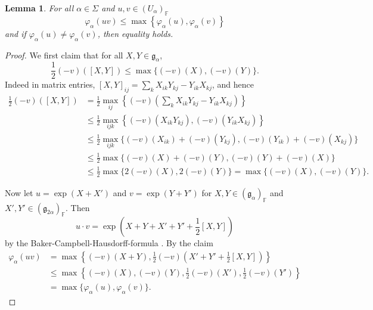 \documentclass[12pt]{amsart}
\newcommand{\F}{\mathbb{F} }
\newcommand{\frakg}{\mathfrak{g}}
\numberwithin{equation}{section}
\newtheorem{lemma}[theorem]{Lemma}
\theoremstyle{remark} %
\begin{document}
\begin{lemma}\label{lem:BTgroup_valuation}
	For all $\alpha \in \Sigma$ and $u,v \in (U_{\alpha})_\F$
	$$
	\varphi_\alpha(uv) \leq \max \left\{ \varphi_\alpha (u) , \varphi_\alpha(v) \right\}
	$$
	and if $\varphi_\alpha(u) \neq \varphi_\alpha(v)$, then equality holds.
\end{lemma}
\begin{proof} We first claim that for all $X,Y \in \frakg_{\alpha}$,
	$$
	\frac{1}{2} (-v)\left(\left[X,Y\right]\right) \leq \max \{ (-v)(X), (-v)(Y) \}.
	$$
	Indeed in matrix entries, $[X,Y]_{ij} = \sum_{k} X_{ik}Y_{kj} - Y_{ik}X_{kj}$, and hence
	\begin{align*}
		\frac{1}{2}(-v)\left(\left[X,Y\right]\right)  &= \frac{1}{2} \max_{ij} \left\{ (-v)\left( \sum_{k} X_{ik}Y_{kj} - Y_{ik}X_{kj}  \right)  \right\} \\
		&\leq \frac{1}{2} \max_{ijk}\left\{ (-v)(X_{ik} Y_{kj}) , (-v)(Y_{ik}X_{kj}) \right\} \\
		& \leq \frac{1}{2} \max_{ijk} \{ (-v)(X_{ik}) + (-v)(Y_{kj}), (-v)(Y_{ik}) + (-v)(X_{kj})  \} \\
		&\leq \frac{1}{2} \max \{ (-v)(X) + (-v)(Y) ,  
		(-v)(Y) + (-v)(X)  \} \\
		&\leq \frac{1}{2} \max \{ 2 (-v)(X), 2(-v)(Y) \} = \max \{ (-v)(X), (-v)(Y) \}.
	\end{align*}
	
	Now let $u = \exp(X+X')$ and $v=\exp(Y+Y')$ for  $X,Y \in (\frakg_\alpha)_\F$ and $X', Y' \in (\frakg_{2\alpha})_\F$. Then
	$$
	u\cdot v = \exp \left( X+Y + X'+Y'+ \frac{1}{2}[X,Y] \right)
	$$
	by the Baker-Campbell-Hausdorff-formula \cite[Proposition \ref{I-prop:BCH}]{AppAGRCF}. By the claim
	\begin{align*}
		\varphi_\alpha(uv) &= \max \left\{ (-v)(X+Y) , \frac{1}{2} (-v)\left(X'+Y' + \frac{1}{2}[X,Y]\right) \right\} \\
		& \leq \max\left\{    (-v)(X), (-v)(Y) , \frac{1}{2}(-v)(X'), \frac{1}{2}(-v)(Y')    \right\} \\
		&= \max \{  \varphi_\alpha(u), \varphi_{\alpha}(v)  \}.
	\end{align*}
	

\end{proof}
\end{document}
